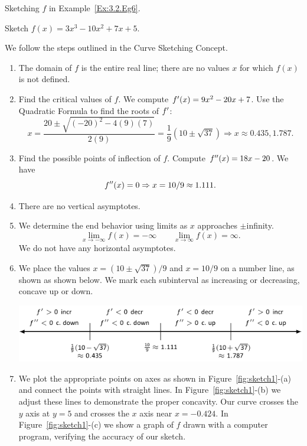 \begin{marginfigure} %


\caption{Sketching $f$ in Example~\ref{Ex:3.2.Eg6}.}
\label{fig:sketch1}
\end{marginfigure}

\begin{example} \label{Ex:3.2.Eg6}
Sketch $f(x) = 3x^3-10x^2+7x+5$.

\solution We follow the steps outlined in the Curve Sketching Concept.
\begin{enumerate}[1)]
\item The domain of $f$ is the entire real line; there are no values $x$ for which $f(x)$ is not defined.
\item Find the critical values of $f$. We compute $f'(x) = 9x^2-20x+7$. Use the Quadratic Formula to find the roots of $f'$:
$$x = \frac{20\pm \sqrt{(-20)^2-4(9)(7)}}{2(9)} = \frac19\left(10\pm\sqrt{37}\right) \Rightarrow x\approx 0.435, 1.787.$$

\item Find the possible points of inflection of $f$. Compute $f''(x) = 18x-20$. We have $$f''(x) = 0 \Rightarrow x= 10/9 \approx 1.111.$$

\item There are no vertical asymptotes.
\item We determine the end behavior using limits as $x$ approaches $\pm$infinity.				
$$\lim_{x\to -\infty} f(x) = -\infty \qquad \lim_{x\to \infty}f(x) = \infty.$$
We do not have any horizontal asymptotes.

\item We place the values $x=(10\pm\sqrt{37})/9$ and $x=10/9$ on a number line, as shown as shown below. We mark each subinterval as increasing or decreasing, concave up or down.

\begin{center}
\includegraphics[scale=.75]{figures/figsketchline1}
\end{center}

\item We plot the appropriate points on axes as shown in Figure~\ref{fig:sketch1}-(a) and connect the points with straight lines. In Figure~\ref{fig:sketch1}-(b) we adjust these lines to demonstrate the proper concavity. Our curve crosses the $y$ axis at $y=5$ and crosses the $x$ axis near $x=-0.424$. In Figure~\ref{fig:sketch1}-(c) we show a graph of $f$ drawn with a computer program, verifying the accuracy of our sketch.
\end{enumerate}
\end{example}